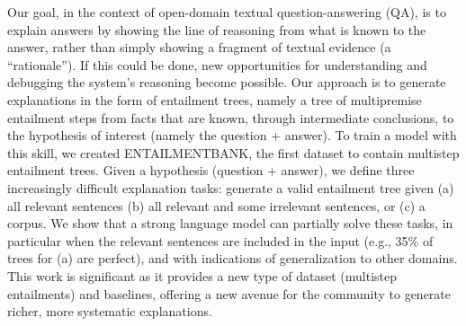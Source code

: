 Our goal, in the context of open-domain textual question-answering (QA), is to explain answers by showing the line of reasoning from what is known to the answer, rather than simply showing a fragment of textual evidence (a ``rationale''). If this could be done, new opportunities for understanding and debugging the system's reasoning become possible. Our approach is to generate explanations in the form of entailment trees, namely a tree of multipremise entailment steps from facts that are known, through intermediate conclusions, to the hypothesis of interest (namely the question + answer). To train a model with this skill, we created ENTAILMENTBANK, the first dataset to contain multistep entailment trees. Given a hypothesis (question + answer), we define three increasingly difficult explanation tasks: generate a valid entailment tree given (a) all relevant sentences (b) all relevant and some irrelevant sentences, or (c) a corpus. We show that a strong language model can partially solve these tasks, in particular when the relevant sentences are included in the input (e.g., 35\% of trees for (a) are perfect), and with indications of generalization to other domains. This work is significant as it provides a new type of dataset (multistep entailments) and baselines, offering a new avenue for the community to generate richer, more systematic explanations.
